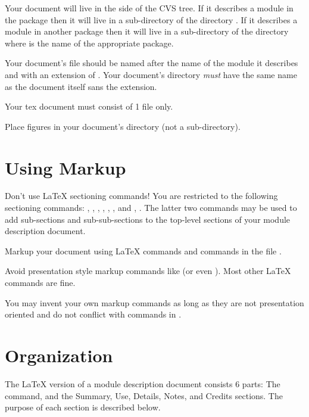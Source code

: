 \documentclass[11pt]{article}
\begin{document}
Your document will live in the  side of the CVS tree.  If it
describes a module in the \sr{} package then it will live in a
sub-directory of the directory .  If it
describes a module in another package then it will live in a sub-directory
of the directory  where
 is the name of the appropriate package.

Your document's file should be named after the name of the module it
describes and with an extension of .  Your document's
directory \emph{must} have the same name as the document itself sans the
 extension. 

Your tex document must consist of 1 file only.

Place figures in your document's directory (not a sub-directory).

\section{Using Markup}

Don't use \LaTeX{} sectioning commands!  You are restricted to the
following sectioning commands: ,
, ,
, ,
, and ,
.  The latter two commands may be used
to add sub-sections and sub-sub-sections to the top-level sections of your
module description document.  

Markup your document using \LaTeX{} commands and commands in the file
. 

Avoid presentation style markup commands like  (or even
).  Most other \LaTeX{} commands are fine.

You may invent your own markup commands as long as they are not
presentation oriented and do not conflict with commands in
.

\section{Organization}

The \LaTeX{} version of a module description document consists 6 parts: The
 command, and the Summary, Use, Details, Notes, and
Credits sections.  The purpose of each section is described below.
\end{document}
